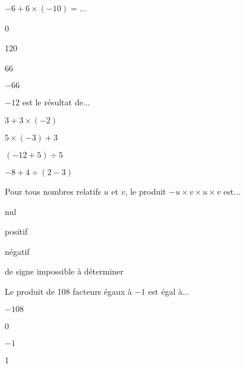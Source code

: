 \begin{QCM}
\begin{GroupeQCM}

\begin{exercice}
$-6 + 6 \times (-10) =$...
\begin{ChoixQCM}{4}
\item 0
\item 120
\item 66
\item $-66$
\end{ChoixQCM}
\begin{corrige}
\end{corrige}
\end{exercice}


\begin{exercice}
$-12$ est le résultat de...
\begin{ChoixQCM}{4}
\item $3 + 3 \times (-2)$
\item $5 \times (-3) + 3$
\item $(-12 + 5) \div 5$
\item $-8 + 4 \div (2 -3)$
\end{ChoixQCM}
\begin{corrige}
\end{corrige}
\end{exercice}




\begin{exercice}
Pour tous nombres relatifs $u$ et $v$, le produit $-u \times v \times u \times v$ est...
\begin{ChoixQCM}{4}
\item nul
\item positif
\item négatif
\item de signe  impossible à déterminer
\end{ChoixQCM}
\begin{corrige}
\end{corrige}
\end{exercice}






\begin{exercice}
Le produit de 108 facteurs égaux à $-1$ est égal à...
\begin{ChoixQCM}{4}
\item $-108$
\item 0
\item $-1$
\item 1
\end{ChoixQCM}
\begin{corrige}
\end{corrige}
\end{exercice}




\end{GroupeQCM}
\end{QCM}
